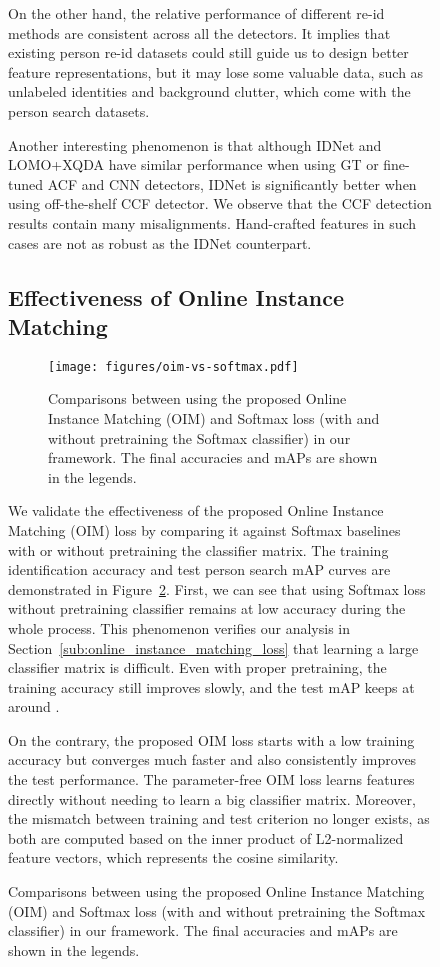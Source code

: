 \documentclass[10pt,twocolumn,letterpaper]{article}
\begin{document}
\begin{figure}[t]
\begin{center}
On the other hand, the relative performance of different re-id methods are consistent across all the detectors. It implies that existing person re-id datasets could still guide us to design better feature representations, but it may lose some valuable data, such as unlabeled identities and background clutter, which come with the person search datasets.

Another interesting phenomenon is that although IDNet and LOMO+XQDA have similar performance when using GT or fine-tuned ACF and CNN detectors, IDNet is significantly better when using off-the-shelf CCF detector. We observe that the CCF detection results contain many misalignments. Hand-crafted features in such cases are not as robust as the IDNet counterpart.


\subsection{Effectiveness of Online Instance Matching} \label{sub:effectiveness_of_online_instance_matching}
\begin{figure}[t]
\begin{center}
\texttt{[image: figures/oim-vs-softmax.pdf]}
\end{center}
\vspace{-3ex}
\caption{Comparisons between using the proposed Online Instance Matching (OIM) and Softmax loss (with and without pretraining the Softmax classifier) in our framework. The final accuracies and mAPs are shown in the legends.}
\vspace{1ex}
\label{fig:oim-vs-softmax}
\end{figure}
We validate the effectiveness of the proposed Online Instance Matching (OIM) loss by comparing it against Softmax baselines with or without pretraining the classifier matrix. The training identification accuracy and test person search mAP curves are demonstrated in Figure~\ref{fig:oim-vs-softmax}. First, we can see that using Softmax loss without pretraining classifier remains at low accuracy during the whole process. This phenomenon verifies our analysis in Section~\ref{sub:online_instance_matching_loss} that learning a large classifier matrix is difficult. Even with proper pretraining, the training accuracy still improves slowly, and the test mAP keeps at around .

On the contrary, the proposed OIM loss starts with a low training accuracy but converges much faster and also consistently improves the test performance. The parameter-free OIM loss learns features directly without needing to learn a big classifier matrix. Moreover, the mismatch between training and test criterion no longer exists, as both are computed based on the inner product of L2-normalized feature vectors, which represents the cosine similarity.


\end{center}
\end{figure}
\end{document}
